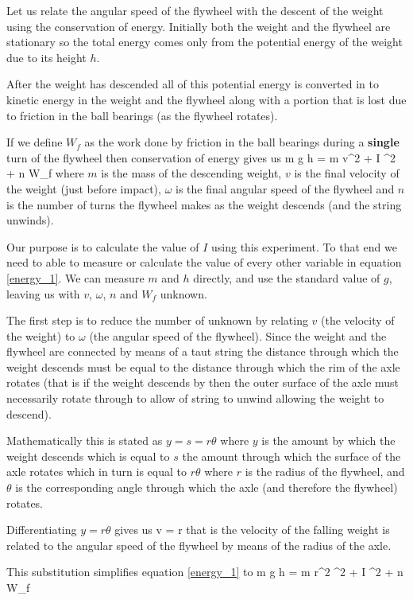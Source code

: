     Let us relate the angular speed of the flywheel with the descent of the weight using the conservation of energy. Initially both the weight and the flywheel are stationary so the total energy comes only from the potential energy of the weight due to its height $h$.

    After the weight has descended all of this potential energy is converted in to kinetic energy in the weight and the flywheel along with a portion that is lost due to friction in the ball bearings (as the flywheel rotates).

    If we define $W_f$ as the work done by friction in the ball bearings during a \textbf{single} turn of the flywheel then conservation of energy gives us
    \beq \label{energy_1}
        m g h =  m v^2 +  I \omega^2 + n W_f
    \eeq
    where $m$ is the mass of the descending weight, $v$ is the final velocity of the weight (just before impact), $\omega$ is the final angular speed of the flywheel and $n$ is the number of turns the flywheel makes as the weight descends (and the string unwinds).

    Our purpose is to calculate the value of $I$ using this experiment. To that end we need to able to measure or calculate the value of every other variable in equation \eqref{energy_1}. We can measure $m$ and $h$ directly, and use the standard value of $g$, leaving us with $v$, $\omega$, $n$ and $W_f$ unknown.

    The first step is to reduce the number of unknown by relating $v$ (the velocity of the weight) to $\omega$ (the angular speed of the flywheel). Since the weight and the flywheel are connected by means of a taut string the distance through which the weight descends must be equal to the distance through which the rim of the axle rotates (that is if the weight descends by  then the outer surface of the axle must necessarily rotate through  to allow  of string to unwind allowing the weight to descend).

    Mathematically this is stated as $y = s = r \theta$ where $y$ is the amount by which the weight descends which is equal to $s$ the amount through which the surface of the axle rotates which in turn is equal to $r \theta$ where $r$ is the radius of the flywheel, and $\theta$ is the corresponding angle through which the axle (and therefore the flywheel) rotates.

    Differentiating $y = r \theta$ gives us
    \beq
        v = r \omega
    \eeq
    that is the velocity of the falling weight is related to the angular speed of the flywheel by means of the radius of the axle.

    This substitution simplifies equation \eqref{energy_1} to
    \beq \label{energy_2}
        m g h =  m r^2 \omega^2 +  I \omega^2 + n W_f
    \eeq
    
